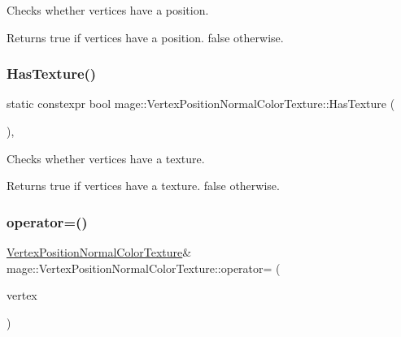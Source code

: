 Checks whether vertices have a position.

\begin{DoxyReturn}{Returns}
{\ttfamily true} if vertices have a position. {\ttfamily false} otherwise. 
\end{DoxyReturn}
\hypertarget{structmage_1_1_vertex_position_normal_color_texture_a27f5a115642f443419683417360fd58e}{}\label{structmage_1_1_vertex_position_normal_color_texture_a27f5a115642f443419683417360fd58e} 
\subsubsection{\texorpdfstring{Has\+Texture()}{HasTexture()}}
{\footnotesize\ttfamily static constexpr bool mage\+::\+Vertex\+Position\+Normal\+Color\+Texture\+::\+Has\+Texture (\begin{DoxyParamCaption}{ }\end{DoxyParamCaption})\hspace{0.3cm}{\ttfamily [static]}, {\ttfamily [noexcept]}}

Checks whether vertices have a texture.

\begin{DoxyReturn}{Returns}
{\ttfamily true} if vertices have a texture. {\ttfamily false} otherwise. 
\end{DoxyReturn}
\hypertarget{structmage_1_1_vertex_position_normal_color_texture_a2053f5942c404f3d42f6e5a129c3e694}{}\label{structmage_1_1_vertex_position_normal_color_texture_a2053f5942c404f3d42f6e5a129c3e694} 
\subsubsection{\texorpdfstring{operator=()}{operator=()}\hspace{0.1cm}{\footnotesize\ttfamily [1/2]}}
{\footnotesize\ttfamily \hyperlink{structmage_1_1_vertex_position_normal_color_texture}{Vertex\+Position\+Normal\+Color\+Texture}\& mage\+::\+Vertex\+Position\+Normal\+Color\+Texture\+::operator= (\begin{DoxyParamCaption}\item[{const \hyperlink{structmage_1_1_vertex_position_normal_color_texture}{Vertex\+Position\+Normal\+Color\+Texture} \&}]{vertex }\end{DoxyParamCaption})\hspace{0.3cm}{\ttfamily [default]}}

